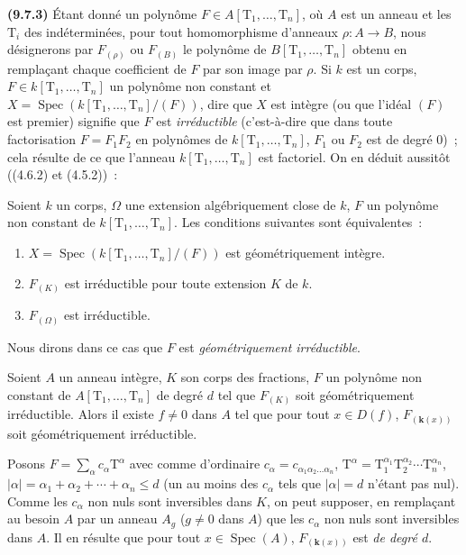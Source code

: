 \label{IV.9.7.3-fr}%
\textbf{(9.7.3)} Étant donné un polynôme
$F\in A[\mathrm T_1,\ldots,\mathrm T_n]$, où $A$ est un anneau et les
$\mathrm T_i$ des indéterminées, pour tout homomorphisme d'anneaux
$\rho:A\to B$, nous désignerons par $F_{(\rho)}$ ou $F_{(B)}$ le polynôme de
$B[\mathrm T_1,\ldots,\mathrm T_n]$ obtenu en remplaçant chaque coefficient de
$F$ par son image par $\rho$. Si $k$ est un corps,
$F\in k[\mathrm T_1,\ldots,\mathrm T_n]$ un polynôme non constant et
$X=\operatorname{Spec}(k[\mathrm T_1,\ldots,\mathrm T_n]/(F))$, dire que $X$
est intègre (ou que l'idéal $(F)$ est premier) signifie que $F$ est
\emph{irréductible} (c'est-à-dire que dans toute factorisation $F=F_1F_2$ en
polynômes de $k[\mathrm T_1,\ldots,\mathrm T_n]$, $F_1$ ou $F_2$ est de degré
$0$)~; cela résulte de ce que l'anneau $k[\mathrm T_1,\ldots,\mathrm T_n]$ est
factoriel. On en déduit aussitôt ((4.6.2) et (4.5.2))~:

\begin{lemma}[9.7.4]
\label{IV.9.7.4-fr}
Soient $k$ un corps, $\Omega$ une extension algébriquement close de $k$, $F$ un
polynôme non constant de $k[\mathrm T_1,\ldots,\mathrm T_n]$. Les conditions
suivantes sont équivalentes~:
\begin{enumerate}[label=\emph{\alph*)}]
  \item $X=\operatorname{Spec}(k[\mathrm T_1,\ldots,\mathrm T_n]/(F))$ est
  géométriquement intègre.
  \item $F_{(K)}$ est irréductible pour toute extension $K$ de $k$.
  \item $F_{(\Omega)}$ est irréductible.
\end{enumerate}
Nous dirons dans ce cas que $F$ est \emph{géométriquement irréductible}.
\end{lemma}

\begin{lemma}[9.7.5]
\label{IV.9.7.5-fr}
Soient $A$ un anneau intègre, $K$ son corps des fractions, $F$ un polynôme non
constant de $A[\mathrm T_1,\ldots,\mathrm T_n]$ de degré $d$ tel que $F_{(K)}$
soit géométriquement irréductible. Alors il existe $f\neq0$ dans $A$ tel que
pour tout $x\in D(f)$, $F_{(\boldsymbol{k}(x))}$ soit géométriquement
irréductible.
\end{lemma}

Posons $F=\sum_\alpha c_\alpha\mathrm T^\alpha$ avec comme d'ordinaire
$c_\alpha=c_{\alpha_1\alpha_2\ldots\alpha_n}$,
$\mathrm T^\alpha=\mathrm T_1^{\alpha_1}\mathrm T_2^{\alpha_2}\cdots
\mathrm T_n^{\alpha_n}$,
$|\alpha|=\alpha_1+\alpha_2+\cdots+\alpha_n\leqslant d$ (un au moins des
$c_\alpha$ tels que $|\alpha|=d$ n'étant pas nul). Comme les $c_\alpha$ non
nuls sont inversibles dans $K$, on peut supposer, en remplaçant au besoin $A$
par un anneau $A_g$ ($g\neq0$ dans $A$) que les $c_\alpha$ non nuls sont
inversibles dans $A$. Il en résulte que pour tout $x\in\operatorname{Spec}(A)$,
$F_{(\boldsymbol{k}(x))}$ est \emph{de degré $d$}.

